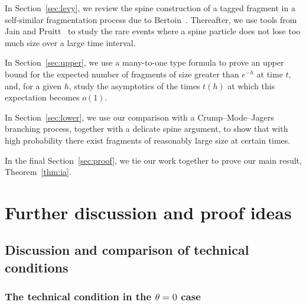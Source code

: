 \documentclass[a4,12pt]{amsart}
\numberwithin{equation}{section}
\begin{document}
	In Section~\ref{sec:levy}, we review the spine construction of a tagged fragment in a self-similar fragmentation 
	process due to Bertoin~\cite{bertoin1}. 
	Thereafter, we use tools from Jain and Pruitt~\cite{JP} to study the rare events where a 
	spine particle does not lose too much size over a large time interval.

	In Section~\ref{sec:upper}, we use a many-to-one type formula to prove an upper bound for 
	the expected number of fragments of size greater than $e^{-h}$ at time $t$, 
	and, for a given $h$, study the asymptotics of the times $t(h)$ at which this expectation becomes $o(1)$.

	In Section~\ref{sec:lower}, we use our comparison with a Crump–Mode–Jagers branching process, 
	together with a delicate spine argument, 
	to show that with high probability there exist fragments of reasonably large size at certain times.

	In the final Section~\ref{sec:proof}, we tie our work together to prove our main result, Theorem~\ref{thm:ia}.

\section{Further discussion and proof ideas} \label{sec:further}

\subsection{Discussion and comparison of technical conditions}

\subsubsection{The technical condition in the $\theta=0$ case}
\end{document}
